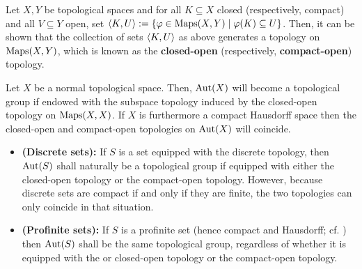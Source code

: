                 \begin{definition} \label{def: the_compact_open_topology}
                    Let $X, Y$ be topological spaces and for all $K \subseteq X$ closed (respectively, compact) and all $V \subseteq Y$ open, set $\langle K, U\rangle := \{\varphi \in \mathrm{Maps}(X, Y) \mid \varphi(K) \subseteq U\}$. Then, it can be shown that the collection of sets $\langle K, U\rangle$ as above generates a topology on $\mathrm{Maps}(X, Y)$, which is known as the \textbf{closed-open} (respectively, \textbf{compact-open}) topology.
                \end{definition}
                \begin{lemma} \label{lemma: the_compact_open_topology_on_automorphism_groups}
                    \cite[Theorem 3.5.2 and Corollary 3.5.3]{topological_groups_and_related_structures} Let $X$ be a normal topological space. Then, $\mathrm{Aut}(X)$ will become a topological group if endowed with the subspace topology induced by the closed-open topology on $\mathrm{Maps}(X, X)$. If $X$ is furthermore a compact Hausdorff space then the closed-open and compact-open topologies on $\mathrm{Aut}(X)$ will coincide.
                \end{lemma}
                \begin{example} \label{example: the_compact_open_topology_on_automorphism_groups_of_sets}
                    \noindent
                    \begin{itemize}
                        \item \textbf{(Discrete sets):} \cite[\href{https://stacks.math.columbia.edu/tag/0BMC}{Tag 0BMC}]{stacks} If $S$ is a set equipped with the discrete topology, then $\mathrm{Aut}(S)$ shall naturally be a topological group if equipped with either the closed-open topology or the compact-open topology. However, because discrete sets are compact if and only if they are finite, the two topologies can only coincide in that situation.
                        \item \textbf{(Profinite sets):} If $S$ is a profinite set (hence compact and Hausdorff; cf. \cite[\href{https://stacks.math.columbia.edu/tag/08ZY}{Tag 08ZY}]{stacks}) then $\mathrm{Aut}(S)$ shall be the same topological group, regardless of whether it is equipped with the or closed-open topology or the compact-open topology. 
                    \end{itemize}
                \end{example}
